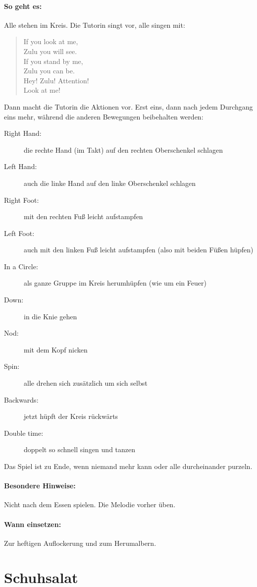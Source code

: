 \paragraph{So geht es:} Alle stehen im Kreis. Die Tutorin singt vor, alle singen mit:
\begin{quote}
	If you look at me,\\
	Zulu you will see.\\
	If you stand by me,\\
	Zulu you can be.\\
	Hey! Zulu! Attention!\\
	Look at me!
\end{quote}
Dann macht die Tutorin die Aktionen vor. Erst eins, dann nach jedem Durchgang eins mehr, während die anderen Bewegungen beibehalten werden:
\begin{description}
	\item[Right Hand:] die rechte Hand (im Takt) auf den rechten Oberschenkel schlagen
	\item[Left Hand:] auch die linke Hand auf den linke Oberschenkel schlagen
	\item[Right Foot:] mit den rechten Fuß leicht aufstampfen
	\item[Left Foot:] auch mit den linken Fuß leicht aufstampfen (also mit beiden Füßen hüpfen)
	\item[In a Circle:]	als ganze Gruppe im Kreis herumhüpfen (wie um ein Feuer)
	\item[Down:] in die Knie gehen
	\item[Nod:] mit dem Kopf nicken
	\item[Spin:] alle drehen sich zusätzlich um sich selbst
  \item[Backwards:] jetzt hüpft der Kreis rückwärts
  \item[Double time:] doppelt so schnell singen und tanzen
\end{description}
Das Spiel ist zu Ende, wenn niemand mehr kann oder alle durcheinander purzeln.
\paragraph{Besondere Hinweise:} Nicht nach dem Essen spielen. Die Melodie vorher üben.
\paragraph{Wann einsetzen:} Zur heftigen Auflockerung und zum Herumalbern.


\section{Schuhsalat}
